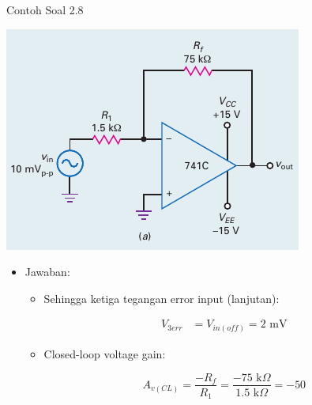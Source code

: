 \begin{frame}[t]{Contoh Soal 2.8}
	\begin{multicols}{2}
		\begin{center}
			\includegraphics[width=\linewidth]{gambar/fig-16.17a}
		\end{center}
		\columnbreak
		\begin{itemize}
			\item Jawaban:
			\begin{itemize}
				\item Sehingga ketiga tegangan error input (lanjutan):
				
				\begin{align*}
					V_{3err} &= V_{in(off)} = 2 \text{ mV}
				\end{align*}
				
				\item Closed-loop voltage gain:
				
				\[ A_{v(CL)} = \frac{-R_f}{R_1} = \frac{-75 \text{ k}\Omega}{1.5 \text{ k}\Omega} = -50\]
				
			\end{itemize}
		\end{itemize}
	\end{multicols}
\end{frame}

